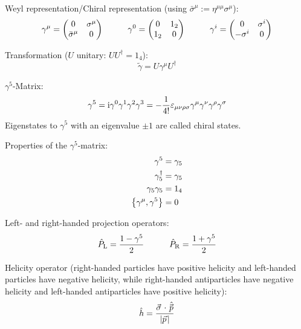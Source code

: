			\noindent
			Weyl representation/Chiral representation  (using $\bar{\sigma}^\mu := \eta^{\mu\mu}\sigma^\mu$):
			\begin{equation}
				\gamma^\mu = \mqty(
					0 & \sigma^\mu \\
					\bar{\sigma}^\mu & 0
				)
				\hsp
				\gamma^0 = \mqty(
					0 & 1_2 \\
					1_2 & 0
				)
				\hsp
				\gamma^i = \mqty(
					0 & \sigma^i \\
					-\sigma^i & 0
				)
			\end{equation}

			\noindent
			Transformation ($U$ unitary: $U U^\dagger=1_4$):
			\begin{equation}
				\tilde{\gamma} = U \gamma^\mu U^\dagger
			\end{equation}

			\noindent
			$\gamma^5$-Matrix:
			\begin{equation}
				\gamma^5 = \mathrm{i}\gamma^0 \gamma^1 \gamma^2 \gamma^3 = -\frac{1}{4!}\varepsilon_{\mu\nu\rho\sigma} \gamma^\mu \gamma^\nu \gamma^\rho \gamma^\sigma
			\end{equation}
			Eigenstates to $\gamma^5$ with an eigenvalue $\pm 1$ are called chiral states.

			\noindent
			Properties of the $\gamma^5$-matrix:
			\begin{equation}
				\begin{aligned}
					\gamma^5 &= \gamma_5 \\
					\gamma_5^\dagger &= \gamma_5 \\
					\gamma_5 \gamma_5 &= 1_4 \\
					\acomm{\gamma^\mu}{\gamma^5} &= 0 \\
				\end{aligned}
			\end{equation}

			\noindent
			Left- and right-handed projection operators:
			\begin{equation}
				\hat{P}_{\mathrm{L}}=\frac{1-\gamma^{5}}{2} \hspace{30pt}
				\hat{P}_{\mathrm{R}}=\frac{1+\gamma^{5}}{2}
			\end{equation}

			\noindent
			Helicity operator (\ie right-handed particles have positive helicity and left-handed particles have negative helicity, while right-handed antiparticles have negative helicity and left-handed antiparticles have positive helicity):
			\begin{equation}
				\hat{h} = \frac{\vec{\sigma}\cdot\hat{\vec{p}}}{\abs{\vec{p}}}
			\end{equation}

